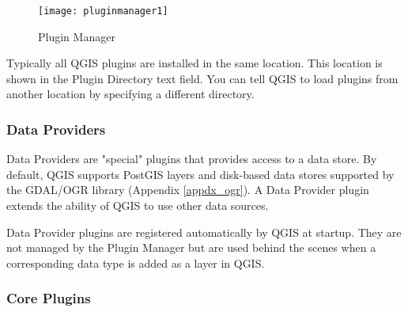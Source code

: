 \begin{figure}[ht]
   \begin{center}
   \caption{Plugin Manager}\label{fig:pluginmanager}\smallskip
   \texttt{[image: pluginmanager1]}
\end{center}  
\end{figure}

Typically all QGIS plugins are installed in the same location. This location
is shown in the Plugin Directory text field. You can tell QGIS to load plugins
from another location by specifying a different directory.

\begin{Tip}\caption{\textsc{Crashing Plugins}}
\end{Tip} 

\subsubsection{Data Providers}

Data Providers are "special" plugins that provides access to a data store. By
default, QGIS supports PostGIS layers and disk-based data stores supported by
the GDAL/OGR library (Appendix \ref{appdx_ogr}). A Data Provider plugin extends the
ability of QGIS to use other data sources.

Data Provider plugins are registered automatically by QGIS at startup. They
are not managed by the Plugin Manager but are used behind the scenes when a
corresponding data type is added as a layer in QGIS.

\subsubsection{Core Plugins}\label{sec:core_plugins}

